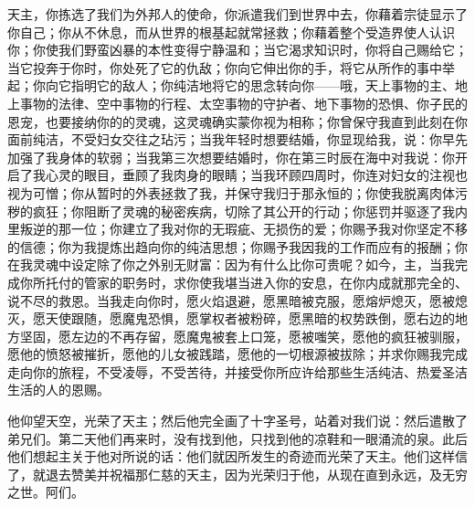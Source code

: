 天主，你拣选了我们为外邦人的使命，你派遣我们到世界中去，你藉着宗徒显示了你自己；你从不休息，而从世界的根基起就常拯救；你藉着整个受造界使人认识你；你使我们野蛮凶暴的本性变得宁静温和；当它渴求知识时，你将自己赐给它；当它投奔于你时，你处死了它的仇敌；你向它伸出你的手，将它从所作的事中举起；你向它指明它的敌人；你纯洁地将它的思念转向你——哦，天上事物的主、地上事物的法律、空中事物的行程、太空事物的守护者、地下事物的恐惧、你子民的恩宠，也要接纳你的的灵魂，这灵魂确实蒙你视为相称；你曾保守我直到此刻在你面前纯洁，不受妇女交往之玷污；当我年轻时想要结婚，你显现给我，说：你早先加强了我身体的软弱；当我第三次想要结婚时，你在第三时辰在海中对我说：你开启了我心灵的眼目，垂顾了我肉身的眼睛；当我环顾四周时，你连对妇女的注视也视为可憎；你从暂时的外表拯救了我，并保守我归于那永恒的；你使我脱离肉体污秽的疯狂；你阻断了灵魂的秘密疾病，切除了其公开的行动；你惩罚并驱逐了我内里叛逆的那一位；你建立了我对你的无瑕疵、无损伤的爱；你赐予我对你坚定不移的信德；你为我提炼出趋向你的纯洁思想；你赐予我因我的工作而应有的报酬；你在我灵魂中设定除了你之外别无财富：因为有什么比你可贵呢？如今，主，当我完成你所托付的管家的职务时，求你使我堪当进入你的安息，在你内成就那完全的、说不尽的救恩。当我走向你时，愿火焰退避，愿黑暗被克服，愿熔炉熄灭，愿被熄灭，愿天使跟随，愿魔鬼恐惧，愿掌权者被粉碎，愿黑暗的权势跌倒，愿右边的地方坚固，愿左边的不再存留，愿魔鬼被套上口笼，愿被嗤笑，愿他的疯狂被驯服，愿他的愤怒被摧折，愿他的儿女被践踏，愿他的一切根源被拔除；并求你赐我完成走向你的旅程，不受凌辱，不受苦待，并接受你所应许给那些生活纯洁、热爱圣洁生活的人的恩赐。\par

他仰望天空，光荣了天主；然后他完全画了十字圣号，站着对我们说：然后遣散了弟兄们。第二天他们再来时，没有找到他，只找到他的凉鞋和一眼涌流的泉。此后他们想起主关于他对所说的话：他们就因所发生的奇迹而光荣了天主。他们这样信了，就退去赞美并祝福那仁慈的天主，因为光荣归于他，从现在直到永远，及无穷之世。阿们。\par

